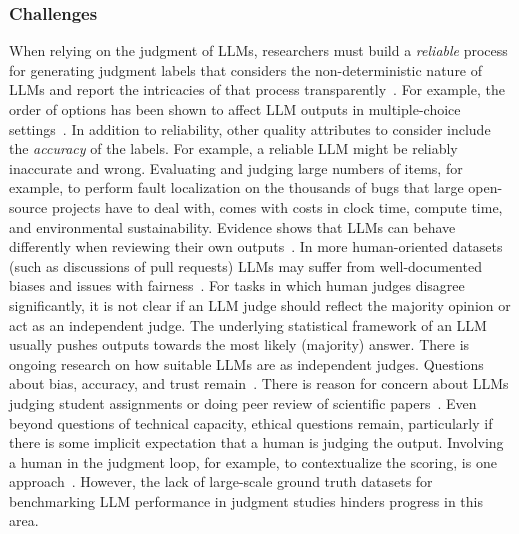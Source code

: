 \subsubsection{Challenges}

When relying on the judgment of LLMs, researchers must build a \textit{reliable} process for generating judgment labels that considers the non-deterministic nature of LLMs and report the intricacies of that process transparently~\cite{DBLP:journals/corr/abs-2412-12509}.
For example, the order of options has been shown to affect LLM outputs in multiple-choice settings~\cite{DBLP:conf/naacl/PezeshkpourH24}. 
In addition to reliability, other quality attributes to consider include the \textit{accuracy} of the labels. %
For example, a reliable LLM might be reliably inaccurate and wrong. 
Evaluating and judging large numbers of items, for example, to perform fault localization on the thousands of bugs that large open-source projects have to deal with, comes with costs in clock time, compute time, and environmental sustainability.
Evidence shows that LLMs can behave differently when reviewing their own outputs~\cite{NEURIPS2024_7f1f0218}.
In more human-oriented datasets (such as discussions of pull requests) LLMs may suffer from well-documented biases and issues with fairness~\cite{Gallegos2024BiasAF}. 
For tasks in which human judges disagree significantly, it is not clear if an LLM judge should reflect the majority opinion or act as an independent judge.
The underlying statistical framework of an LLM usually pushes outputs towards the most likely (majority) answer. 
There is ongoing research on how suitable LLMs are as independent judges.
Questions about bias, accuracy, and trust remain~\cite{DBLP:journals/corr/abs-2406-18403}.
There is reason for concern about LLMs judging student assignments or doing peer review of scientific papers~\cite{DBLP:conf/coling/ZhouC024}.
Even beyond questions of technical capacity, ethical questions remain, particularly if there is some implicit expectation that a human is judging the output.
Involving a human in the judgment loop, for example, to contextualize the scoring, is one approach~\cite{panHumanCenteredDesignRecommendations2024}. 
However, the lack of large-scale ground truth datasets for benchmarking LLM performance in judgment studies hinders progress in this area.


